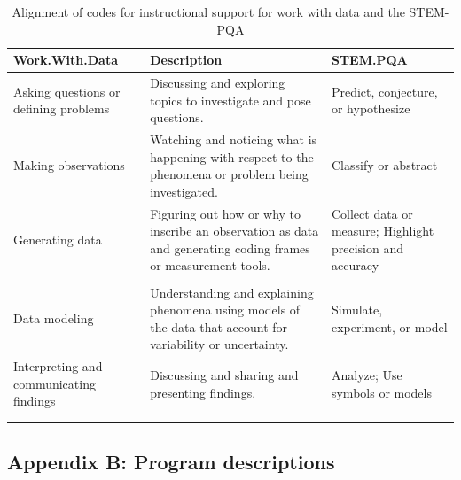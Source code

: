 \documentclass[]{msu-thesis}
\theoremstyle{definition}
\theoremstyle{definition}
\theoremstyle{definition}
\theoremstyle{remark}
\begin{document}
\begin{landscape}\begin{table}

\caption{\label{tab:unnamed-chunk-14}Alignment of codes for instructional support for work with data and the STEM-PQA}
\centering
\begin{tabular}[t]{lll}
\toprule
Work.With.Data & Description & STEM.PQA\\
\midrule
Asking questions or defining problems & Discussing and exploring topics to investigate and pose questions. & Predict, conjecture, or hypothesize\\
Making observations & Watching and noticing what is happening with respect to the phenomena or problem being investigated. & Classify or abstract\\
Generating data & Figuring out how or why to inscribe an observation as data and generating coding frames or measurement tools. & Collect data or measure; Highlight precision and accuracy\\
 &  & \\
Data modeling & Understanding and explaining phenomena using models of the data that account for variability or uncertainty. & Simulate, experiment, or model\\
Interpreting and communicating findings & Discussing and sharing and presenting findings. & Analyze; Use symbols or models\\
 &  & \\
 &  & \\
\bottomrule
\end{tabular}
\end{table}
\end{landscape}

\subsection{Appendix B: Program
descriptions}\label{appendix-b-program-descriptions}
\end{document}
